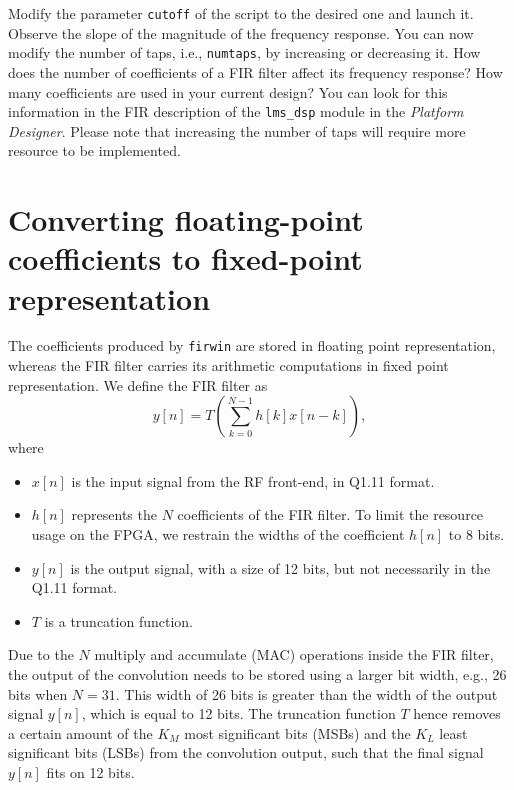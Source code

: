 Modify the parameter \texttt{cutoff} of the script to the desired one and launch it. Observe the slope of the magnitude of the frequency response. You can now modify the number of taps, i.e., \texttt{numtaps}, by increasing or decreasing it. How does the number of coefficients of a FIR filter affect its frequency response? How many coefficients are used in your current design? You can look for this information in the FIR description of the \texttt{lms\_dsp} module in the \textit{Platform Designer}. Please note that increasing the number of taps will require more resource to be implemented.

\section{Converting floating-point coefficients to fixed-point representation}

The coefficients produced by \texttt{firwin} are stored in floating point representation, whereas the FIR filter carries its arithmetic computations in fixed point representation.
We define the FIR filter as \\
\begin{equation}
    y[n] = T\left( \sum^{N-1}_{k=0} h[k] x[n-k] \right),
\end{equation}
where
\begin{itemize}
    \item $x[n]$ is the input signal from the RF front-end, in Q1.11 format.
    \item $h[n]$ represents the $N$ coefficients of the FIR filter. To limit the resource usage on the FPGA, we restrain the widths of the coefficient $h[n]$ to 8 bits.
    \item $y[n]$ is the output signal, with a size of 12 bits, but not necessarily in the Q1.11 format.
    \item $T$ is a truncation function.
\end{itemize}

Due to the $N$ multiply and accumulate (MAC) operations inside the FIR filter, the output of the convolution needs to be stored using a larger bit width, e.g., 26 bits when $N = 31$. This width of 26 bits is greater than the width of the output signal $y[n]$, which is equal to 12 bits. The truncation function $T$ hence removes a certain amount of the $K_M$ most significant bits (MSBs) and the $K_L$ least significant bits (LSBs) from the convolution output, such that the final signal $y[n]$ fits on 12 bits.

